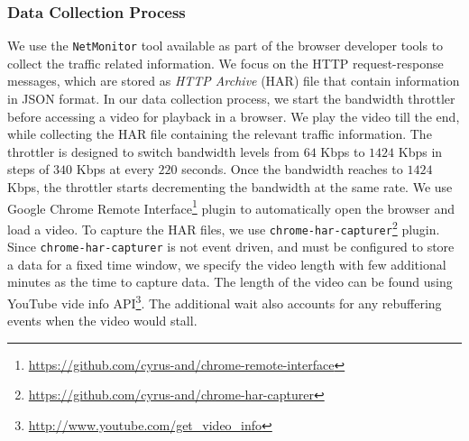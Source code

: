 \subsubsection{Data Collection Process}
We use the {\tt NetMonitor} tool available as part of the browser developer tools to collect the traffic related information.
We focus on the HTTP request-response messages, which are stored as {\em HTTP Archive} (HAR) file that contain information in JSON format. In our data collection process, we start the bandwidth throttler before accessing a video for playback in a browser. We play the video till the end, while collecting the HAR file containing the relevant traffic information.
The throttler is designed to switch bandwidth levels from $64$ Kbps to $1424$ Kbps in steps of $340$ Kbps at every $220$ seconds. Once the bandwidth reaches to $1424$ Kbps, the throttler starts decrementing the bandwidth at the same rate. 
We use Google Chrome Remote Interface\footnote{\url{https://github.com/cyrus-and/chrome-remote-interface}} plugin to automatically open the browser and load a video.
To capture the HAR files, we use \texttt{chrome-har-capturer}\footnote{\url{https://github.com/cyrus-and/chrome-har-capturer}} plugin.
Since \texttt{chrome-har-capturer} is not event driven, and must be configured to store a data for a fixed time window, we specify the video length with few additional minutes as the time to capture data. The length of the video can be found using YouTube vide info API\footnote{\url{http://www.youtube.com/get_video_info}}.
The additional wait also accounts for any rebuffering events when the video would stall.

